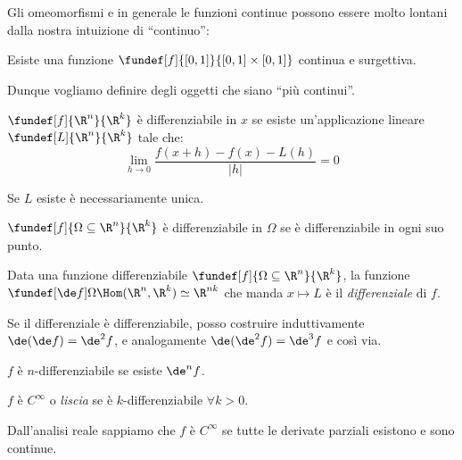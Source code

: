 Gli omeomorfismi e in generale le funzioni continue possono essere molto lontani dalla nostra intuizione di ``continuo'':

\begin{es}
	Esiste una funzione $\fundef[f]{[0,1]}{[0,1]\times[0,1]}$ continua e surgettiva.\footnotemark
\end{es}

Dunque vogliamo definire degli oggetti che siano ``più continui''.

\begin{defn}
	$\fundef[f]{\R^n}{\R^k}$ è differenziabile in $x$ se esiste un'applicazione lineare
	$\fundef[L]{\R^n}{\R^k}$ tale che:
	\[\lim_{h\to 0}{\frac{f(x+h)-f(x)-L(h)}{|h|}}=0\]
\end{defn}

\begin{fat}
	Se $L$ esiste è necessariamente unica.
\end{fat}

\begin{defn}
	$\fundef[f]{\Omega \subseteq \R^n}{\R^k}$ è differenziabile in $\Omega$
	se è differenziabile in ogni suo punto.
\end{defn}

\begin{defn}
	Data una funzione differenziabile $\fundef[f]{\Omega \subseteq \R^n}{\R^k}$,
	la funzione $\fundef[\de f]\Omega{\Hom(\R^n,\R^k)\simeq\R^{nk}}$
	che manda $x\mapsto L$
	è il \emph{differenziale} di $f$.
\end{defn}

\begin{oss}
	Se il differenziale è differenziabile,
	posso costruire induttivamente $\de(\de f) = \de^2f$,
	e analogamente $\de(\de^2f) = \de^3f$ e così via.
\end{oss}

\begin{defn}
	$f$ è $n$-differenziabile se esiste $\de^n f$.
\end{defn}

\begin{defn}
	$f$ è $C^{\infty}$ o \emph{liscia} se è $k$-differenziabile $\forall k > 0$.
\end{defn}

\begin{fat}
	Dall'analisi reale sappiamo che $f$ è $C^{\infty}$
	se tutte le derivate parziali esistono e sono continue.
\end{fat}


